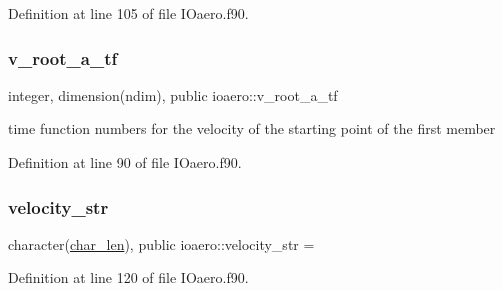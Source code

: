 Definition at line 105 of file I\+Oaero.\+f90.

\mbox{\label{namespaceioaero_adb4e11942a388b1bf1f13d10c79614bc}} 
\subsubsection{\texorpdfstring{v\+\_\+root\+\_\+a\+\_\+tf}{v\_root\_a\_tf}}
{\footnotesize\ttfamily integer, dimension(ndim), public ioaero\+::v\+\_\+root\+\_\+a\+\_\+tf}



time function numbers for the velocity of the starting point of the first member 



Definition at line 90 of file I\+Oaero.\+f90.

\mbox{\label{namespaceioaero_ac653c5aea8d1de1b6255d0f47b6722f6}} 
\subsubsection{\texorpdfstring{velocity\+\_\+str}{velocity\_str}}
{\footnotesize\ttfamily character(\hyperlink{namespaceioaero_acd6bdfdcfd986fd1c26261e5996e3b03}{char\+\_\+len}), public ioaero\+::velocity\+\_\+str = \textquotesingle{}\textquotesingle{}}



Definition at line 120 of file I\+Oaero.\+f90.

